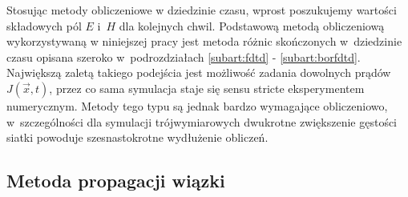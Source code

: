 
Stosując metody obliczeniowe w dziedzinie czasu, wprost poszukujemy wartości składowych pól $E$ i~$H$ dla kolejnych chwil. Podstawową metodą obliczeniową wykorzystywaną w niniejszej pracy jest metoda różnic skończonych w~dziedzinie czasu opisana szeroko w~podrozdziałach \ref{subart:fdtd} - \ref{subart:borfdtd}. Największą zaletą takiego podejścia jest możliwość zadania dowolnych prądów $J(\vec{x},t)$, przez co sama symulacja staje się sensu stricte eksperymentem numerycznym. Metody tego typu są jednak bardzo wymagające obliczeniowo, w~szczególności dla symulacji trójwymiarowych dwukrotne zwiększenie gęstości siatki powoduje szesnastokrotne wydłużenie obliczeń. 

\subsection{Metoda propagacji wiązki} 


